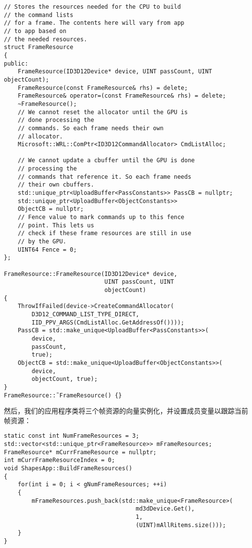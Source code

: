 \begin{lstlisting}
// Stores the resources needed for the CPU to build
// the command lists
// for a frame. The contents here will vary from app
// to app based on
// the needed resources.
struct FrameResource
{
public:
    FrameResource(ID3D12Device* device, UINT passCount, UINT objectCount);
    FrameResource(const FrameResource& rhs) = delete;
    FrameResource& operator=(const FrameResource& rhs) = delete;
    ~FrameResource();
    // We cannot reset the allocator until the GPU is
    // done processing the
    // commands. So each frame needs their own
    // allocator.
    Microsoft::WRL::ComPtr<ID3D12CommandAllocator> CmdListAlloc;
    
    // We cannot update a cbuffer until the GPU is done
    // processing the
    // commands that reference it. So each frame needs
    // their own cbuffers.
    std::unique_ptr<UploadBuffer<PassConstants>> PassCB = nullptr;
    std::unique_ptr<UploadBuffer<ObjectConstants>>
    ObjectCB = nullptr;
    // Fence value to mark commands up to this fence
    // point. This lets us
    // check if these frame resources are still in use
    // by the GPU.
    UINT64 Fence = 0;
};

FrameResource::FrameResource(ID3D12Device* device,
                             UINT passCount, UINT
                             objectCount)
{
    ThrowIfFailed(device->CreateCommandAllocator(
        D3D12_COMMAND_LIST_TYPE_DIRECT,
        IID_PPV_ARGS(CmdListAlloc.GetAddressOf())));
    PassCB = std::make_unique<UploadBuffer<PassConstants>>(
        device,
        passCount, 
        true);
    ObjectCB = std::make_unique<UploadBuffer<ObjectConstants>>(
        device,
        objectCount, true);
}
FrameResource::˜FrameResource() {}
\end{lstlisting}
\begin{flushleft}
然后，我们的应用程序类将三个帧资源的向量实例化，并设置成员变量以跟踪当前帧资源：\\
\end{flushleft}
\begin{lstlisting}
static const int NumFrameResources = 3;
std::vector<std::unique_ptr<FrameResource>> mFrameResources;
FrameResource* mCurrFrameResource = nullptr;
int mCurrFrameResourceIndex = 0;
void ShapesApp::BuildFrameResources()
{
    for(int i = 0; i < gNumFrameResources; ++i)
    {
        mFrameResources.push_back(std::make_unique<FrameResource>(
                                      md3dDevice.Get(), 
                                      1, 
                                      (UINT)mAllRitems.size()));
    }
}
\end{lstlisting}
